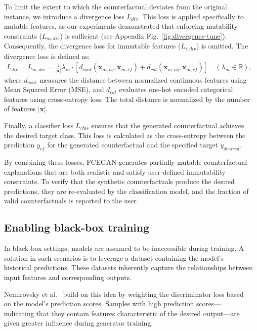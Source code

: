 \documentclass[runningheads]{llncs}
\begin{document}
To limit the extent to which the counterfactual deviates from the original instance, we introduce a divergence loss \( L_{div} \). This loss is applied specifically to mutable features, as our experiments demonstrated that enforcing mutability constraints (\( L_{m,div} \)) is sufficient (see Appendix Fig.~\ref{fig:divergence-tune}). Consequently, the divergence loss for immutable features (\( L_{i,div} \)) is omitted. The divergence loss is defined as:
\begin{equation}
\begin{aligned}
L_{div} = L_{m,div} = \frac{1}{\left|\mathbf{x}\right|} \lambda_{m} \cdot [d_{cont}(\mathbf{x}_{m,og}, \mathbf{x}_{m,cf}) + d_{cat}(\mathbf{x}_{m,og}, \mathbf{x}_{m,cf})] \quad (\lambda_{m} \in \mathbb{R}),
\end{aligned}
\label{eq:div-loss}
\end{equation}
where \( d_{cont} \) measures the distance between normalized continuous features using Mean Squared Error (MSE), and \( d_{cat} \) evaluates one-hot encoded categorical features using cross-entropy loss. The total distance is normalized by the number of features \( |\mathbf{x}| \).

Finally, a classifier loss \( L_{clas} \) ensures that the generated counterfactual achieves the desired target class. This loss is calculated as the cross-entropy between the prediction \( y_{cf} \) for the generated counterfactual and the specified target \( y_{desired} \).

By combining these losses, FCEGAN generates partially mutable counterfactual explanations that are both realistic and satisfy user-defined immutability constraints. To verify that the synthetic counterfactuals produce the desired predictions, they are re-evaluated by the classification model, and the fraction of valid counterfactuals is reported to the user.

\subsection{Enabling black-box training}
In black-box settings, models are assumed to be inaccessible during training. A solution in such scenarios is to leverage a dataset containing the model's historical predictions. These datasets inherently capture the relationships between input features and corresponding outputs.

Nemirovsky et al.~\cite{nemirovsky_2022_countergan} build on this idea by weighting the discriminator loss based on the model's prediction scores. Samples with high prediction scores— indicating that they contain features characteristic of the desired output—are given greater influence during generator training.
\end{document}
